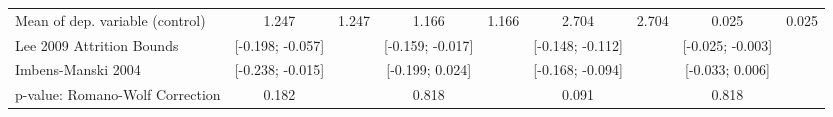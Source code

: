 {\begin{tabular}{l*{8}{c}}
Mean of dep. variable (control)                   &       1.247         &       1.247         &       1.166         &       1.166         &       2.704         &       2.704         &       0.025         &       0.025         \\
Lee 2009 Attrition Bounds                         &[-0.198; -0.057]         &                     &[-0.159; -0.017]         &                     &[-0.148; -0.112]         &                     &[-0.025; -0.003]         &                     \\
Imbens-Manski 2004                                &[-0.238; -0.015]         &                     &[-0.199; 0.024]         &                     &[-0.168; -0.094]         &                     &[-0.033; 0.006]         &                     \\
p-value: Romano-Wolf Correction                   &       0.182         &                     &       0.818         &                     &       0.091         &                     &       0.818         &                     \\
\hline\hline
\end{tabular}
}
